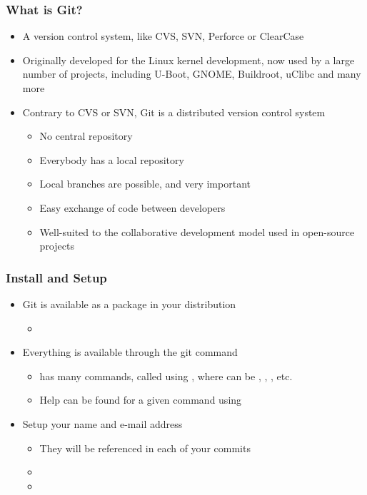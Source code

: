 \begin{frame}
  \frametitle{What is Git?}
  \begin{itemize}
  \item A version control system, like CVS, SVN, Perforce or ClearCase
  \item Originally developed for the Linux kernel development, now
    used by a large number of projects, including U-Boot, GNOME,
    Buildroot, uClibc and many more
  \item Contrary to CVS or SVN, Git is a distributed version control
    system
    \begin{itemize}
    \item No central repository
    \item Everybody has a local repository
    \item Local branches are possible, and very important
    \item Easy exchange of code between developers
    \item Well-suited to the collaborative development model used in
      open-source projects
    \end{itemize}
  \end{itemize}
\end{frame}

\begin{frame}
  \frametitle{Install and Setup}
  \begin{itemize}
  \item Git is available as a package in your distribution
    \begin{itemize}
    \item {}
    \end{itemize}
  \item Everything is available through the git command
    \begin{itemize}
    \item {} has many commands, called using
      , where  can be
      , , , etc.
    \item Help can be found for a given command using
    \end{itemize}
  \item Setup your name and e-mail address
    \begin{itemize}
    \item They will be referenced in each of your commits
    \item {}
    \item {}
    \end{itemize}
  \end{itemize}
\end{frame}

